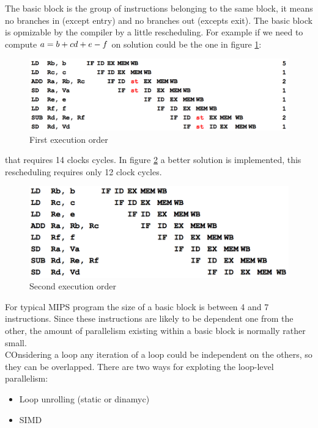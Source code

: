 \documentclass[12pt]{article}
\begin{document}
The basic block is the group of instructions belonging to the same block, it means no branches in (except entry) and no branches out (excepts exit). The basic block is opmizable by the compiler by a little rescheduling. For example if we need to compute $a=b+c\\d+e-f$ on solution could be the one in figure \ref{fig:stall}:
\begin{figure}[h!]
  \centering
  \includegraphics[width=\linewidth]{images/stall.png}
  \caption{First execution order}
  \label{fig:stall}
\end{figure}
that requires 14 clocks cycles. In figure \ref{fig:stall2} a better solution is implemented, this rescheduling requires only 12 clock cycles.
\begin{figure}[h!]
  \centering
  \includegraphics[width=\linewidth]{images/stall2.png}
  \caption{Second execution order}
  \label{fig:stall2}
\end{figure}
 For typical MIPS program the size of a basic block is between 4 and 7 instructions. Since these instructions are likely to be dependent one from the other, the amount of parallelism existing within a basic block is normally rather small.\\
 COnsidering a loop any iteration of a loop could be independent on the others, so they can be overlapped. There are two ways for exploting the loop-level parallelism:
 \begin{itemize}
   \item Loop unrolling (static or dinamyc)
   \item SIMD
 \end{itemize}
\end{document}
